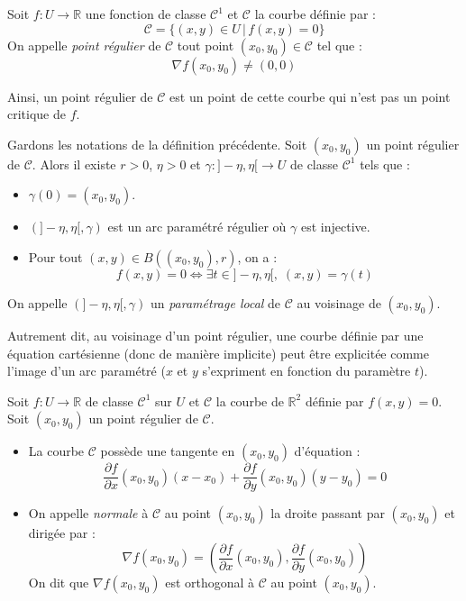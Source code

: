 \documentclass[a4paper,10pt]{report}
\begin{document}
\begin{defin} Soit $f : U \rightarrow \mathbb{R}$ une fonction de classe $\mathcal{C}^1$ et $\mathcal{C}$ la courbe définie par :
$$ \mathcal{C} = \lbrace (x,y) \in U \, \vert \, f(x,y)=0 \rbrace$$
\noindent On appelle \textit{point régulier} de $\mathcal{C}$ tout point $(x_0,y_0) \in \mathcal{C}$ tel que :
$$ \nabla f(x_0,y_0) \neq (0,0)$$
\end{defin}
\noindent Ainsi, un point régulier de $\mathcal{C}$ est un point de cette courbe qui n'est pas un point critique de $f$.

\begin{thm} Gardons les notations de la définition précédente. Soit $(x_0,y_0)$ un point régulier de $\mathcal{C}$. Alors il existe $r>0$, $\eta>0$ et $\gamma : ]- \eta, \eta[ \rightarrow U$ de classe $\mathcal{C}^1$ tels que :
\begin{itemize}
\item $\gamma(0)= (x_0,y_0)$.
\item $(]-\eta,\eta[, \gamma)$ est un arc paramétré régulier où $\gamma$ est injective.
\item Pour tout $(x,y) \in B((x_0,y_0),r)$, on a :
$$ f(x,y)=0 \Longleftrightarrow \exists t \in ]- \eta, \eta[, \; (x,y)=\gamma(t)$$
\end{itemize}
On appelle $(]-\eta,\eta[, \gamma)$ un \textit{paramétrage local} de $\mathcal{C}$ au voisinage de $(x_0,y_0)$.
\end{thm}

\medskip

\noindent Autrement dit, au voisinage d'un point régulier, une courbe définie par une équation cartésienne (donc de manière implicite) peut être explicitée comme l'image d'un arc paramétré ($x$ et $y$ s'expriment en fonction du paramètre $t$).

\medskip

\begin{defip} Soit $f : U \rightarrow \mathbb{R}$ de classe $\mathcal{C}^1$ sur $U$ et $\mathcal{C}$ la courbe de $\mathbb{R}^2$ définie par $f(x,y)=0$. Soit $(x_0,y_0)$ un point régulier de $\mathcal{C}$.
\begin{itemize}
\item La courbe $\mathcal{C}$ possède une tangente en $(x_0,y_0)$ d'équation :
$$ \dfrac{\partial f}{\partial  x}(x_0,y_0)(x-x_0) + \dfrac{\partial f}{\partial y}(x_0,y_0) (y-y_0)=0$$
\item On appelle \textit{normale} à $\mathcal{C}$ au point $(x_0,y_0)$ la droite passant par $(x_0,y_0)$ et dirigée par :
$$ \nabla f(x_0,y_0) = \left(\dfrac{\partial f}{\partial  x}(x_0,y_0), \dfrac{\partial f}{\partial  y}(x_0,y_0) \right)$$
On dit que $ \nabla f(x_0,y_0)$ est orthogonal à $\mathcal{C}$ au point $(x_0,y_0)$.
\end{itemize}
\end{defip}
\end{document}
